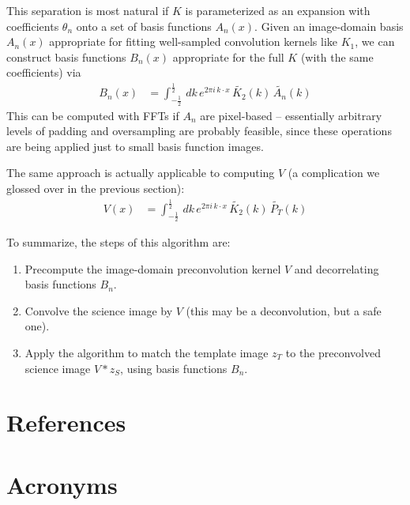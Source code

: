 \documentclass[DM,authoryear,toc]{lsstdoc}
\newcommand{\AL}{\citetalias{1998ApJ...503..325A}}
\begin{document}
This separation is most natural if $K$ is parameterized as an expansion with coefficients $\theta_n$ onto a set of basis functions $A_n(x)$.
Given an image-domain basis $A_n(x)$ appropriate for fitting well-sampled convolution kernels like $K_1$, we can construct basis functions $B_n(x)$ appropriate for the full $K$ (with the same coefficients) via
\begin{align}
  B_n(x) & = \int_{-\frac{1}{2}}^{\frac{1}{2}} \, dk \,
    e^{2\pi i \, k \cdot x} \, \widetilde{K_2}(k) \, \widetilde{A_n}(k)
\end{align}
This can be computed with FFTs if $A_n$ are pixel-based -- essentially arbitrary levels of padding and oversampling are probably feasible, since these operations are being applied just to small basis function images.

The same approach is actually applicable to computing $V$ (a complication we glossed over in the previous section):
\begin{align}
  V(x) & = \int_{-\frac{1}{2}}^{\frac{1}{2}} \, dk \,
  e^{2\pi i \, k \cdot x} \, \widetilde{K_2}(k) \, \widetilde{P_T}(k)
\end{align}

To summarize, the steps of this algorithm are:
\begin{enumerate}
  \item Precompute the image-domain preconvolution kernel $V$ and decorrelating basis functions $B_n$.
  \item Convolve the science image by $V$ (this may be a deconvolution, but a safe one).
  \item Apply the \AL{} algorithm to match the template image $z_T$ to the preconvolved science image $V \ast z_S$, using basis functions $B_n$.
\end{enumerate}

\appendix
\section{References} \label{sec:bib}
\renewcommand{\refname}{} %


\section{Acronyms} \label{sec:acronyms}

\end{document}
